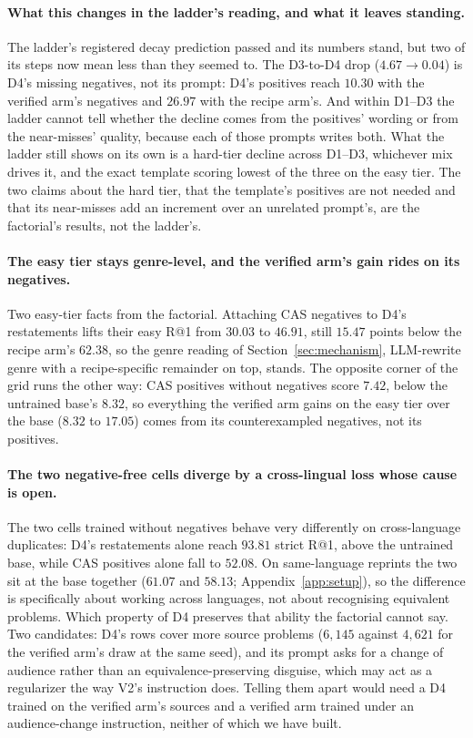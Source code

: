 \paragraph{What this changes in the ladder's reading, and what it leaves standing.}The ladder's registered decay prediction passed and its numbers stand, but two of its steps now mean less than they seemed to. The D3-to-D4 drop ($4.67 \to 0.04$) is D4's missing negatives, not its prompt: D4's positives reach $10.30$ with the verified arm's negatives and $26.97$ with the recipe arm's. And within D1--D3 the ladder cannot tell whether the decline comes from the positives' wording or from the near-misses' quality, because each of those prompts writes both. What the ladder still shows on its own is a hard-tier decline across D1--D3, whichever mix drives it, and the exact template scoring lowest of the three on the easy tier. The two claims about the hard tier, that the template's positives are not needed and that its near-misses add an increment over an unrelated prompt's, are the factorial's results, not the ladder's.

\paragraph{The easy tier stays genre-level, and the verified arm's gain rides on its negatives.}Two easy-tier facts from the factorial. Attaching CAS negatives to D4's restatements lifts their easy R@1 from $30.03$ to $46.91$, still $15.47$ points below the recipe arm's $62.38$, so the genre reading of Section~\ref{sec:mechanism}, LLM-rewrite genre with a recipe-specific remainder on top, stands. The opposite corner of the grid runs the other way: CAS positives without negatives score $7.42$, below the untrained base's $8.32$, so everything the verified arm gains on the easy tier over the base ($8.32$ to $17.05$) comes from its counterexampled negatives, not its positives.

\paragraph{The two negative-free cells diverge by a cross-lingual loss whose cause is open.}
The two cells trained without negatives behave very differently on cross-language duplicates: D4's restatements alone reach $93.81$ strict R@1, above the untrained base, while CAS positives alone fall to $52.08$. On same-language reprints the two sit at the base together ($61.07$ and $58.13$; Appendix~\ref{app:setup}), so the difference is specifically about working across languages, not about recognising equivalent problems. Which property of D4 preserves that ability the factorial cannot say. Two candidates: D4's rows cover more source problems ($6{,}145$ against $4{,}621$ for the verified arm's draw at the same seed), and its prompt asks for a change of audience rather than an equivalence-preserving disguise, which may act as a regularizer the way V2's instruction does. Telling them apart would need a D4 trained on the verified arm's sources and a verified arm trained under an audience-change instruction, neither of which we have built.


